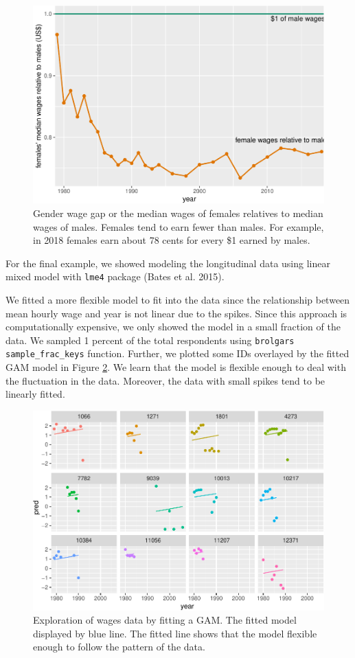 \documentclass{article}
\begin{document}
\begin{figure}
\centering
\includegraphics{figures/se-gender-1.pdf}
\caption{\label{fig:se-gender}Gender wage gap or the median wages of females relatives to median wages of males. Females tend to earn fewer than males. For example, in 2018 females earn about 78 cents for every \$1 earned by males.}
\end{figure}

For the final example, we showed modeling the longitudinal data using linear mixed model with \texttt{lme4} package (Bates et al. 2015).

We fitted a more flexible model to fit into the data since the relationship between mean hourly wage and year is not linear due to the spikes. Since this approach is computationally expensive, we only showed the model in a small fraction of the data. We sampled 1 percent of the total respondents using \texttt{brolgar\textquotesingle{}s} \texttt{sample\_frac\_keys} function. Further, we plotted some IDs overlayed by the fitted GAM model in Figure \ref{fig:plot-gam}. We learn that the model is flexible enough to deal with the fluctuation in the data. Moreover, the data with small spikes tend to be linearly fitted.

\begin{figure}
\centering
\includegraphics{figures/plot-gam-1.pdf}
\caption{\label{fig:plot-gam}Exploration of wages data by fitting a GAM. The fitted model displayed by blue line. The fitted line shows that the model flexible enough to follow the pattern of the data.}
\end{figure}
\end{document}
